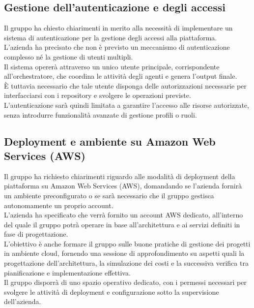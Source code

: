 \subsection{Gestione dell’autenticazione e degli accessi}
Il gruppo ha chiesto chiarimenti in merito alla necessità di implementare un sistema di autenticazione per la gestione degli accessi alla piattaforma.\\
L’azienda ha precisato che non è previsto un meccanismo di autenticazione complesso né la gestione di utenti multipli.\\
Il sistema opererà attraverso un unico utente principale, corrispondente all’orchestratore, che coordina le attività degli agenti e genera l’output finale.\\
È tuttavia necessario che tale utente disponga delle autorizzazioni necessarie per interfacciarsi con i repository e svolgere le operazioni previste.\\
L’autenticazione sarà quindi limitata a garantire l’accesso alle risorse autorizzate, senza introdurre funzionalità avanzate di gestione profili o ruoli.

\subsection{Deployment e ambiente su Amazon Web Services (AWS)}
Il gruppo ha richiesto chiarimenti riguardo alle modalità di deployment della piattaforma su Amazon Web Services (AWS), domandando se l’azienda fornirà un ambiente preconfigurato o se sarà necessario che il gruppo gestisca autonomamente un proprio account.\\
L’azienda ha specificato che verrà fornito un account AWS dedicato, all’interno del quale il gruppo potrà operare in base all’architettura e ai servizi definiti in fase di progettazione.\\
L’obiettivo è anche formare il gruppo sulle buone pratiche di gestione dei progetti in ambiente cloud, fornendo una sessione di approfondimento su aspetti quali la progettazione dell’architettura, la simulazione dei costi e la successiva verifica tra pianificazione e implementazione effettiva.\\
Il gruppo disporrà di uno spazio operativo dedicato, con i permessi necessari per svolgere le attività di deployment e configurazione sotto la supervisione dell’azienda.

